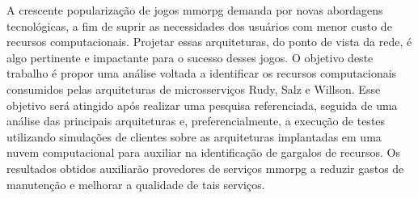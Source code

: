 A crescente popularização de jogos \acf{mmorpg} demanda por novas abordagens tecnológicas, a fim de suprir as necessidades dos usuários com menor custo de recursos computacionais.
%
Projetar essas arquiteturas, do ponto de vista da rede, é algo pertinente e impactante para o sucesso desses jogos.
%
O objetivo deste trabalho é propor uma análise voltada a identificar os recursos computacionais consumidos pelas arquiteturas de microsserviços Rudy, Salz e Willson.
%
Esse objetivo será atingido após realizar uma pesquisa referenciada, seguida de uma análise das principais arquiteturas e, preferencialmente, a execução de testes utilizando simulações de clientes sobre as arquiteturas implantadas em uma nuvem computacional para auxiliar na identificação de gargalos de recursos. 
%
Os resultados obtidos auxiliarão provedores de serviços \ac{mmorpg} a reduzir gastos de manutenção e melhorar a qualidade de tais serviços. \\

